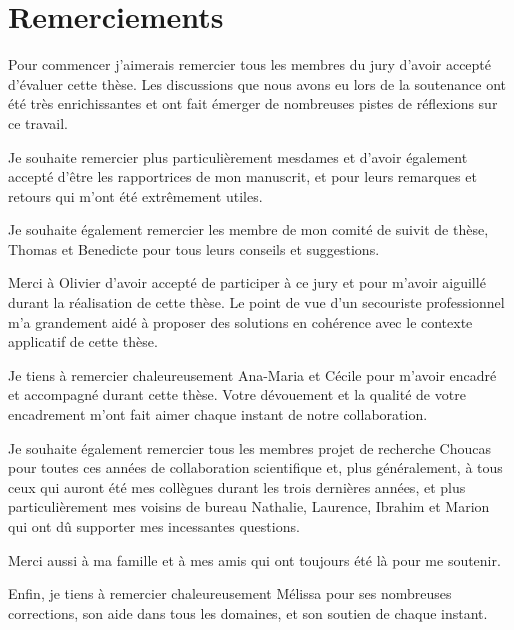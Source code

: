 \section*{Remerciements}

Pour commencer j'aimerais remercier tous les membres du jury d'avoir
accepté d'évaluer cette thèse. Les discussions que nous avons eu lors
de la soutenance ont été très enrichissantes et ont fait émerger de
nombreuses pistes de réflexions sur ce travail.

Je souhaite remercier plus particulièrement mesdames
 et  d'avoir également accepté
d'être les rapportrices de mon manuscrit, et pour leurs remarques et
retours qui m'ont été extrêmement utiles.

Je souhaite également remercier les membre de mon comité de suivit de
thèse, Thomas  et Benedicte  pour tous leurs
conseils et suggestions.

Merci à Olivier  d'avoir accepté de participer à ce jury et
pour m'avoir aiguillé durant la réalisation de cette thèse. Le point
de vue d'un secouriste professionnel m'a grandement aidé à proposer
des solutions en cohérence avec le contexte applicatif de cette thèse.

Je tiens à remercier chaleureusement Ana-Maria 
et Cécile  pour m'avoir encadré et accompagné durant
cette thèse. Votre dévouement et la qualité de votre encadrement m'ont
fait aimer chaque instant de notre collaboration.  

Je souhaite également remercier tous les membres projet de recherche
Choucas pour toutes ces années de collaboration scientifique et, plus
généralement, à tous ceux qui auront été mes collègues durant les
trois dernières années, et plus particulièrement mes voisins de bureau
Nathalie, Laurence, Ibrahim et Marion qui ont dû supporter mes
incessantes questions.

Merci aussi à ma famille et à mes amis qui ont toujours été là pour me
soutenir.

Enfin, je tiens à remercier chaleureusement Mélissa pour ses
nombreuses corrections, son aide dans tous les domaines, et son
soutien de chaque instant.

